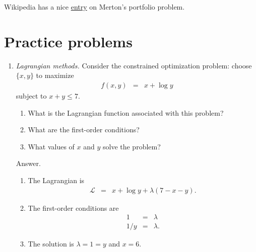 \documentclass[11pt]{article}
\begin{document}
Wikipedia has a nice 
\href{http://en.wikipedia.org/wiki/Merton's_portfolio_problem}{entry}
on Merton's portfolio problem.  


\section*{Practice problems}

\begin{enumerate}
\item {\it Lagrangian methods.\/}
Consider the constrained optimization problem:  choose $\{x,y\}$
to maximize
\begin{eqnarray*}
    f(x,y) &=& x + \log y
\end{eqnarray*}
subject to $ x + y \leq 7$.
%
\begin{enumerate}
\item What is the Lagrangian function associated with this problem?
\item What are the first-order conditions?
\item What values of $x$ and $y$ solve the problem?
\end{enumerate}
%
Answer.
\begin{enumerate}
\item The Lagrangian is
\begin{eqnarray*}
    \mathcal{L} &=& x + \log y  + \lambda (7 - x - y ).
\end{eqnarray*}
\item The first-order conditions are
\begin{eqnarray*}
    1 &=& \lambda \\
    1/y &=& \lambda .
\end{eqnarray*}
\item The solution is $\lambda = 1 = y$ and $x = 6$.
\end{enumerate}


\end{enumerate}
\end{document}
